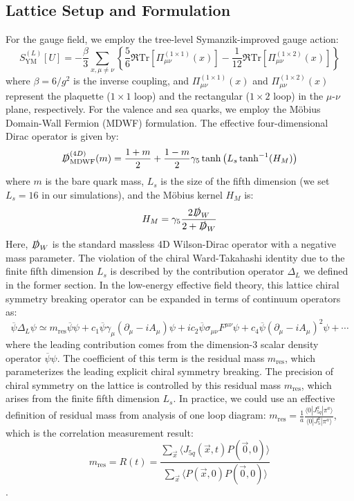 \subsection{Lattice Setup and Formulation}
For the gauge field, we employ the tree-level Symanzik-improved gauge action:
\begin{equation}
S_{\text{YM}}^{(L)}[U] = -\frac{\beta}{3} \sum_{x, \mu \neq \nu} \left\{ \frac{5}{6} \Re \text{Tr} \left[ \Pi_{\mu\nu}^{(1 \times 1)}(x) \right] - \frac{1}{12} \Re \text{Tr} \left[ \Pi_{\mu\nu}^{(1 \times 2)}(x) \right] \right\}
\label{eq:symanzik_action}
\end{equation}
where $\beta = 6/g^2$ is the inverse coupling, and $\Pi_{\mu\nu}^{(1 \times 1)}(x)$ and $\Pi_{\mu\nu}^{(1 \times 2)}(x)$ represent the plaquette ($1 \times 1$ loop) and the rectangular ($1 \times 2$ loop) in the $\mu$-$\nu$ plane, respectively. For the valence and sea quarks, we employ the M\"obius Domain-Wall Fermion (MDWF) formulation. The effective four-dimensional Dirac operator is given by:
\begin{equation}
\slashed{D}_{\mathrm{MDWF}}^{(4D)}(m) = \frac{1+m}{2} + \frac{1-m}{2} \gamma_5 \tanh \left( L_s \tanh^{-1}(H_M) \right)
\label{eq:mdwf_effective_analysis}
\end{equation}
where $m$ is the bare quark mass, $L_s$ is the size of the fifth dimension (we set $L_s = 16$ in our simulations), and the M\"obius kernel $H_M$ is:
\begin{equation}
H_M = \gamma_5 \frac{2 \slashed{D}_W}{2 + \slashed{D}_W}
\label{eq:mobius_hamiltonian_analysis}
\end{equation}
Here, $\slashed{D}_W$ is the standard massless 4D Wilson-Dirac operator with a negative mass parameter. The violation of the chiral Ward-Takahashi identity due to the finite fifth dimension $L_s$ is described by the contribution operator $\Delta_L$ we defined in the former section. In the low-energy effective field theory, this lattice chiral symmetry breaking operator can be expanded in terms of continuum operators as:
\begin{equation}
\overline{\psi} \Delta_L \psi \simeq m_{\mathrm{res}} \overline{\psi} \psi + c_1 \overline{\psi} \gamma_\mu (\partial_\mu - i A_\mu) \psi + i c_2 \overline{\psi} \sigma_{\mu\nu} F^{\mu\nu} \psi + c_4 \overline{\psi} (\partial_\mu - i A_\mu)^2 \psi + \cdots
\label{eq:midpoint_operator_expansion}
\end{equation}
where the leading contribution comes from the dimension-3 scalar density operator $\overline{\psi} \psi$. The coefficient of this term is the residual mass $m_{\mathrm{res}}$, which parameterizes the leading explicit chiral symmetry breaking. The precision of chiral symmetry on the lattice is controlled by this residual mass $m_{\mathrm{res}}$, which arises from the finite fifth dimension $L_s$.
In practice, we could use an effective definition of residual mass from analysis of one loop diagram:
$m_{\mathrm{res}} = \frac{1}{a} \frac{\langle 0 | J_{5q}^a | \pi^a \rangle}{\langle 0 | J_5^a | \pi^a \rangle}$, which is the correlation measurement result:
$$m_{\mathrm{res}} = R(t) = \frac{\sum_{\vec{x}} \langle J_{5q}(\vec{x}, t) P(\vec{0}, 0) \rangle}{\sum_{\vec{x}} \langle P(\vec{x}, 0) P(\vec{0}, 0) \rangle}$$.

